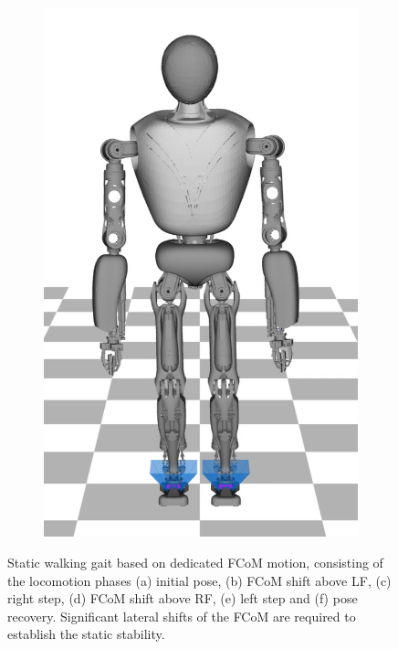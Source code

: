\begin{figure}
\begin{subfigure}{.16\textwidth}
	\includegraphics[width=1\linewidth]{fig/walkStatic/snaps/9}
	\caption{}
\end{subfigure}
\caption[Static walking based on dedicated \gls{FCoM} shifting]{Static walking gait based on dedicated \gls{FCoM} motion, consisting of the locomotion phases (a) initial pose, (b) \gls{FCoM} shift above \gls{LF}, (c) right step, (d) \gls{FCoM} shift above \gls{RF}, (e) left step and (f) pose recovery. Significant lateral shifts of the \gls{FCoM} are required to establish the static stability.}
\label{fig:walkStatic_Snaps}
\end{figure}

